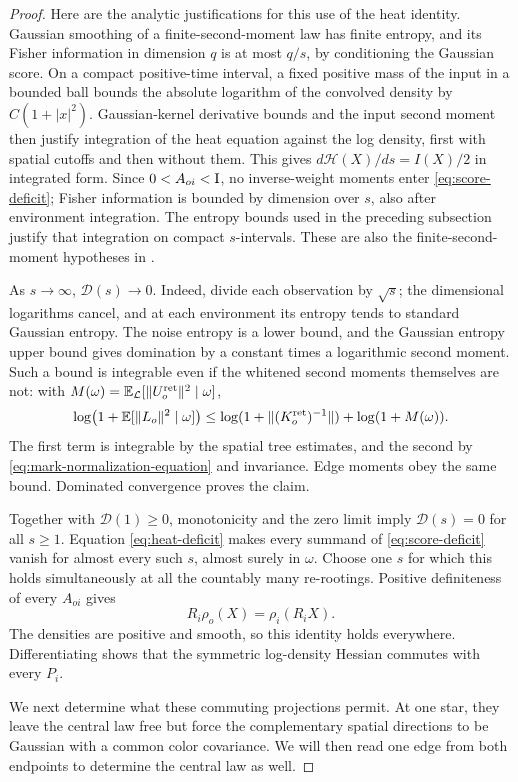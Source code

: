 \begin{proof}
Here are the analytic justifications for this use of the heat
identity.  Gaussian smoothing of a finite-second-moment law
has finite entropy, and its Fisher information in dimension
\(q\) is at most \(q/s\), by conditioning the Gaussian score.
On a compact positive-time interval, a fixed positive mass of
the input in a bounded ball bounds the absolute logarithm of
the convolved density by \(C(1+|x|^2)\).  Gaussian-kernel
derivative bounds and the input second moment then justify
integration of the heat equation against the log density,
first with spatial cutoffs and then without them.  This gives
\(d\mathcal H(X)/ds=I(X)/2\) in integrated form.  Since
\(0<A_{oi}<\mathrm I\), no inverse-weight moments enter
\eqref{eq:score-deficit}; Fisher information is bounded by
dimension over \(s\), also after environment integration.
The entropy bounds used in the preceding subsection justify
that integration on compact \(s\)-intervals.  These are also
the finite-second-moment hypotheses in
\cite[Appendix~A, Equation~(A.1) and Lemmas~A.2--A.3]{BackhauszSzegedy2019}.

As \(s\to\infty\), \(\mathcal D(s)\to0\).  Indeed, divide
each observation by \(\sqrt s\); the dimensional logarithms
cancel, and at each environment its entropy tends to standard
Gaussian entropy.  The noise entropy is a lower bound, and
the Gaussian entropy upper bound gives domination by a
constant times a logarithmic second moment.  Such a bound is
integrable even if the whitened second moments themselves
are not: with \(M(\omega)=\mathbb E_{\mathcal L}
[\|U_o^{\rm ret}\|^2\mid\omega]\),
\[
 \log\bigl(1+\mathbb E[\|L_o\|^2\mid\omega]\bigr)
 \le\log(1+\|(K_o^{\rm ret})^{-1}\|)+\log(1+M(\omega)).
\]
The first term is integrable by the spatial tree estimates,
and the second by \eqref{eq:mark-normalization-equation} and
invariance.  Edge moments obey the same bound.  Dominated
convergence proves the claim.

Together with \(\mathcal D(1)\ge0\), monotonicity and the zero
limit imply \(\mathcal D(s)=0\) for all \(s\ge1\).  Equation
\eqref{eq:heat-deficit} makes every summand of
\eqref{eq:score-deficit} vanish for almost every such \(s\),
almost surely in \(\omega\).  Choose one \(s\) for which this
holds simultaneously at all the countably many re-rootings.
Positive definiteness of every \(A_{oi}\) gives
\[
 R_i\rho_o(X)=\rho_i(R_iX).
\]
The densities are positive and smooth, so this identity holds
everywhere.  Differentiating shows that the symmetric
log-density Hessian commutes with every \(P_i\).

We next determine what these commuting projections permit.  At one
star, they leave the central law free but force the complementary
spatial directions to be Gaussian with a common color covariance.
We will then read one edge from both endpoints to determine the
central law as well.


\end{proof}
